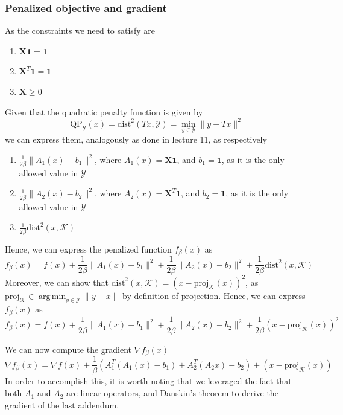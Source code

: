 \documentclass[12pt]{article}
\DeclareMathOperator*{\argmin}{arg\,min}
\newcommand{\boldX}{\mathbf{X}}
\newcommand{\boldOne}{\mathbf{1}}
\newcommand{\dist}{\text{dist}}
\newcommand{\QP}{\text{QP}}
\newcommand*{\proj}{\text{proj}}
\begin{document}
\subsubsection{Penalized objective and gradient}
As the constraints we need to satisfy are
\begin{enumerate}
    \item $\boldX \boldOne = \boldOne$
    \item $\boldX^T \boldOne = \boldOne$
    \item $\boldX \geq 0$
\end{enumerate}
Given that the quadratic penalty function is given by
\begin{equation}
    \QP_{\mathcal{Y}}(x) = \dist^2(Tx, \mathcal{Y}) = \min_{y \in \mathcal{Y}} \lVert y - Tx \rVert^2
\end{equation}
we can express them, analogously as done in lecture 11, as respectively
\begin{enumerate}
    \item $\frac{1}{2\beta} \lVert A_1(x) - b_1 \rVert^{2}$, where $A_1(x) = \boldX \boldOne$, and $b_1 = \boldOne$, as it is the only allowed value in $\mathcal{Y}$
    \item $\frac{1}{2\beta} \lVert A_2(x) - b_2 \rVert^{2}$, where $A_2(x) = \boldX^T \boldOne$, and $b_2 = \boldOne$, as it is the only allowed value in $\mathcal{Y}$
    \item $\frac{1}{2\beta} \dist^2(x, \mathcal{K})$
\end{enumerate}
Hence, we can express the penalized function $f_{\beta}(x)$ as
\begin{equation}
    f_{\beta}(x) = f(x) + \frac{1}{2\beta} \lVert A_1(x) - b_1 \rVert^{2} + \frac{1}{2\beta} \lVert A_2(x) - b_2 \rVert^{2} + \frac{1}{2\beta} \dist^2(x, \mathcal{K})
\end{equation}
Moreover, we can show that $\dist^2(x, \mathcal{K}) = (x - \proj_{\mathcal{K}}(x))^2$, as $\proj_{\mathcal{K}} \in \argmin_{y \in \mathcal{Y}} \lVert y - x \rVert $ by definition of projection. Hence, we can express $f_{\beta}(x)$ as
\begin{equation}
    f_{\beta}(x) = f(x) + \frac{1}{2\beta} \lVert A_1(x) - b_1 \rVert^{2} + \frac{1}{2\beta} \lVert A_2(x) - b_2 \rVert^{2} + \frac{1}{2\beta} (x - \proj_{\mathcal{K}}(x))^2
\end{equation}

We can now compute the gradient $\nabla f_{\beta}(x)$
\begin{equation}
    \nabla f_{\beta}(x) = \nabla f(x) + \frac{1}{\beta} (A_1^T(A_1(x) - b_1) + A_2^T(A_2x) - b_2) + (x - \proj_{\mathcal{K}}(x))
\end{equation}
In order to accomplish this, it is worth noting that we leveraged the fact that both $A_1$ and $A_2$ are linear operators, and Danskin's theorem to derive the gradient of the last addendum.
\end{document}
